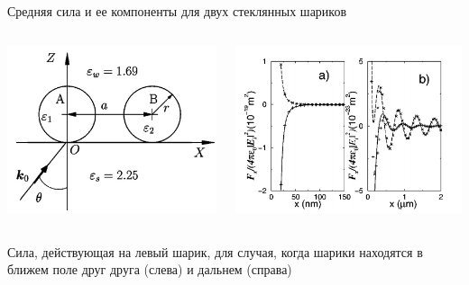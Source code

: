 \documentclass[9pt, compress, xcolor=table]{beamer}
\begin{document}
\begin{frame}{Средняя сила и ее компоненты для двух стеклянных шариков}
\begin{columns}
\column{6.5cm}

\begin{center}
\includegraphics[width=1\textwidth]{spheres}
\end{center}

\column{6.5cm}

\begin{center}
\includegraphics[width=1\textwidth]{force_two_spheres}
\end{center}

\end{columns}

Сила, действующая на левый шарик, для случая, когда шарики находятся в ближем поле друг друга (слева) и дальнем (справа)
\end{frame}
\end{document}
